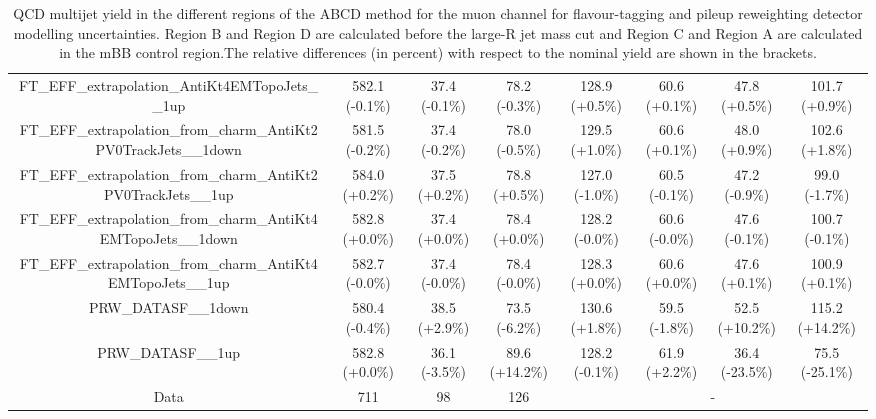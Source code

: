 \begin{table}[htbp!]
\begin{tiny}
\begin{center}
\begin{tabular}{c|c|c|c||c|c|c|c}
FT\_EFF\_extrapolation\_AntiKt4EMTopoJets\_\_1up             & 582.1     (-0.1\%) & 37.4      (-0.1\%) & 78.2      (-0.3\%) & 128.9     (+0.5\%) & 60.6      (+0.1\%) & 47.8      (+0.5\%) & 101.7     (+0.9\%) \\ 
FT\_EFF\_extrapolation\_from\_charm\_AntiKt2PV0TrackJets\_\_1down & 581.5     (-0.2\%) & 37.4      (-0.2\%) & 78.0      (-0.5\%) & 129.5     (+1.0\%) & 60.6      (+0.1\%) & 48.0      (+0.9\%) & 102.6     (+1.8\%) \\ 
FT\_EFF\_extrapolation\_from\_charm\_AntiKt2PV0TrackJets\_\_1up & 584.0     (+0.2\%) & 37.5      (+0.2\%) & 78.8      (+0.5\%) & 127.0     (-1.0\%) & 60.5      (-0.1\%) & 47.2      (-0.9\%) & 99.0      (-1.7\%) \\ 
FT\_EFF\_extrapolation\_from\_charm\_AntiKt4EMTopoJets\_\_1down & 582.8     (+0.0\%) & 37.4      (+0.0\%) & 78.4      (+0.0\%) & 128.2     (-0.0\%) & 60.6      (-0.0\%) & 47.6      (-0.1\%) & 100.7     (-0.1\%) \\ 
FT\_EFF\_extrapolation\_from\_charm\_AntiKt4EMTopoJets\_\_1up & 582.7     (-0.0\%) & 37.4      (-0.0\%) & 78.4      (-0.0\%) & 128.3     (+0.0\%) & 60.6      (+0.0\%) & 47.6      (+0.1\%) & 100.9     (+0.1\%) \\ 
PRW\_DATASF\_\_1down                                         & 580.4     (-0.4\%) & 38.5      (+2.9\%) & 73.5      (-6.2\%) & 130.6     (+1.8\%) & 59.5      (-1.8\%) & 52.5      (+10.2\%) & 115.2     (+14.2\%) \\ 
PRW\_DATASF\_\_1up                                           & 582.8     (+0.0\%) & 36.1      (-3.5\%) & 89.6      (+14.2\%) & 128.2     (-0.1\%) & 61.9      (+2.2\%) & 36.4      (-23.5\%) & 75.5      (-25.1\%) \\ 
\hline 
\hline 
Data                                                        & 711  & 98   & 126 &\multicolumn{4}{c}{-} \\  
\hline
\end{tabular}
\end{center}
\caption{QCD multijet yield in the different regions of the ABCD method for the muon channel for flavour-tagging and pileup reweighting 
detector modelling uncertainties. Region B and Region D are calculated before the large-R jet mass cut and Region C and Region A are 
calculated in the mBB control region.The relative differences (in percent) with respect to the nominal yield are shown in the brackets.} 
\label{tab:boosted_qcd_detsyst_muon_mbbcr_2}
\end{tiny}
\end{table} 
